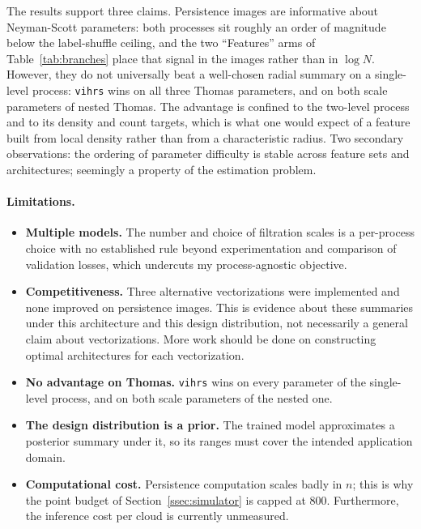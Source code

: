 \documentclass[11pt,a4paper]{article}
\begin{document}
The results support three claims. Persistence images are informative about
Neyman-Scott parameters: both processes sit roughly an order of magnitude below
the label-shuffle ceiling, and the two ``Features'' arms of
Table~\ref{tab:branches} place that signal in the images rather than in
$\log N$. However, they do not universally beat a well-chosen radial summary on a
single-level process: \texttt{vihrs} wins on all three Thomas parameters, and on
both scale parameters of nested Thomas. The advantage is confined to the
two-level process and to its density and count targets, which is what one would
expect of a feature built from local density rather than from a characteristic
radius. Two secondary observations: the ordering of parameter difficulty is
stable across feature sets and architectures; seemingly a property of the
estimation problem.

\paragraph{Limitations.}
\begin{itemize}[leftmargin=*,itemsep=2pt]
    \item \textbf{Multiple models.} The number and choice of filtration scales is a
    per-process choice with no established rule beyond experimentation and
    comparison of validation losses, which undercuts my process-agnostic
    objective.
    \item \textbf{Competitiveness.} Three alternative vectorizations were
    implemented and none improved on persistence images. This is evidence about
    these summaries under this architecture and this design distribution, not necessarily a
    general claim about vectorizations. More work should be done on constructing optimal architectures for each vectorization.
    \item \textbf{No advantage on Thomas.} \texttt{vihrs} wins on every
    parameter of the single-level process, and on both scale parameters of the
    nested one.
    \item \textbf{The design distribution is a prior.} The trained model
    approximates a posterior summary under it, so its ranges must cover the
    intended application domain.
    \item \textbf{Computational cost.} Persistence computation scales badly in
    $n$; this is why the point budget of Section~\ref{ssec:simulator} is capped
    at 800. Furthermore, the inference cost per cloud is currently unmeasured.
\end{itemize}
\end{document}
